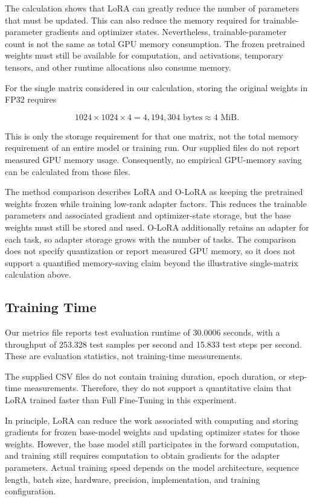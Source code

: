 The calculation shows that LoRA can greatly reduce the number
of parameters that must be updated. This can also reduce the
memory required for trainable-parameter gradients and optimizer
states. Nevertheless, trainable-parameter count is not the same
as total GPU memory consumption. The frozen pretrained weights
must still be available for computation, and activations,
temporary tensors, and other runtime allocations also consume
memory.

For the single matrix considered in our calculation, storing the
original weights in FP32 requires

$$
	1024 \times 1024 \times 4
	= 4,194,304 \text{ bytes}
	\approx 4 \text{ MiB}.
$$

This is only the storage requirement for that one matrix, not
the total memory requirement of an entire model or training run.
Our supplied files do not report measured
GPU memory usage. Consequently, no empirical GPU-memory saving
can be calculated from those files.

The method comparison describes LoRA and O-LoRA as keeping the
pretrained weights frozen while training low-rank adapter factors.
This reduces the trainable parameters and associated gradient and
optimizer-state storage, but the base weights must still be stored
and used. O-LoRA additionally retains an adapter for each task, so
adapter storage grows with the number of tasks. The comparison does
not specify quantization or report measured GPU memory, so it does
not support a quantified memory-saving claim beyond the illustrative
single-matrix calculation above.

\subsection{Training Time}

Our metrics file reports test evaluation runtime of
30.0006 seconds, with a throughput of 253.328 test samples per
second and 15.833 test steps per second. These are evaluation
statistics, not training-time measurements.

The supplied CSV files do not contain training duration,
epoch duration, or step-time measurements. Therefore, they do
not support a quantitative claim that LoRA trained faster than
Full Fine-Tuning in this experiment.

In principle, LoRA can reduce the work associated with
computing and storing gradients for frozen base-model weights
and updating optimizer states for those weights. However, the
base model still participates in the forward computation, and
training still requires computation to obtain gradients for
the adapter parameters. Actual training speed depends on the
model architecture, sequence length, batch size, hardware,
precision, implementation, and training configuration.

